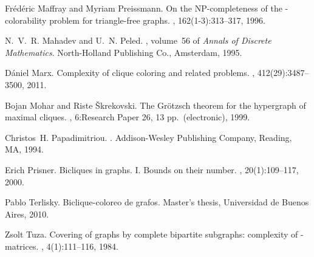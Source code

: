 \documentclass[a4paper, 11pt, oneside]{article}
\begin{document}
\begin{thebibliography}{10}
Fr{\'e}d{\'e}ric Maffray and Myriam Preissmann.
\newblock On the {NP}-completeness of the {}-colorability problem for
  triangle-free graphs.
, 162(1-3):313--317, 1996.

N.~V.~R. Mahadev and U.~N. Peled.
, volume~56 of {\em Annals
  of Discrete Mathematics}.
\newblock North-Holland Publishing Co., Amsterdam, 1995.

D{\'a}niel Marx.
\newblock Complexity of clique coloring and related problems.
, 412(29):3487--3500, 2011.

Bojan Mohar and Riste {\v{S}}krekovski.
\newblock The {G}r\"otzsch theorem for the hypergraph of maximal cliques.
, 6:Research Paper 26, 13 pp.\
  (electronic), 1999.

Christos~H. Papadimitriou.
.
\newblock Addison-Wesley Publishing Company, Reading, MA, 1994.

Erich Prisner.
\newblock Bicliques in graphs. {I}. {B}ounds on their number.
, 20(1):109--117, 2000.

Pablo Terlisky.
\newblock Biclique-coloreo de grafos.
\newblock Master's thesis, Universidad de Buenos Aires, 2010.

Zsolt Tuza.
\newblock Covering of graphs by complete bipartite subgraphs: complexity of
  {}-{} matrices.
, 4(1):111--116, 1984.

\end{thebibliography}
\end{document}

